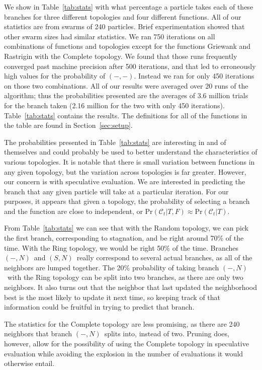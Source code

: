 \documentclass[ms,electronic,twosidetoc,letterpaper,chaptercenter,parttop,equalmargins]{byumsphd}
\renewcommand{\sec}[1]{Section~\ref{sec:#1}}
\providecommand{\caseset}{\ensuremath{\mathcal{C}}}
\providecommand{\casepn}{\ensuremath{(-,-)}}
\providecommand{\casepN}{\ensuremath{(-,N)}}
\providecommand{\casexN}{\ensuremath{(S,N)}}
\providecommand{\prob}{\ensuremath{\mathrm{Pr}}}
\begin{document}
We show in Table~\ref{tab:stats} with what percentage a particle takes each of
these branches for three different topologies and four different functions.
All of our statistics are from swarms of 240 particles.  Brief experimentation
showed that other swarm sizes had similar statistics.  We ran 750 iterations on
all combinations of functions and topologies except for the functions Griewank
and Rastrigin with the Complete topology.  We found that those runs frequently
converged past machine precision after 500 iterations, and that led to
erroneously high values for the probability of \casepn.  Instead we ran for
only 450 iterations on those two combinations.  All of our results were
averaged over 20 runs of the algorithm; thus the probabilities presented are
the averages of 3.6 million trials for the branch taken (2.16 million for the
two with only 450 iterations).  Table~\ref{tab:stats} contains the results.
The definitions for all of the functions in the table are found in \sec{setup}.

The probabilities presented in Table~\ref{tab:stats} are interesting in and of
themselves and could probably be used to better understand the characteristics
of various topologies.  It is notable that there is small variation between
functions in any given topology, but the variation across topologies is far
greater.  However, our concern is with speculative evaluation.  We are
interested in predicting the branch that any given particle will take at a
particular iteration.  For our purposes, it appears that given a topology, the
probability of selecting a branch and the function are close to independent, or
$\prob(\caseset_t|T,F) \approx \prob(\caseset_t|T)$.

From Table~\ref{tab:stats} we can see that with the Random topology, we can
pick the first branch, corresponding to stagnation, and be right around 70\% of
the time.  With the Ring topology, we would be right 50\% of the time.
Branches \casepN\ and \casexN\ really correspond to several actual branches, as
all of the neighbors are lumped together.  The 20\% probability of taking
branch \casepN\ with the Ring topology can be split into two branches, as there
are only two neighbors.  It also turns out that the neighbor that last updated
the neighborhood best is the most likely to update it next time, so keeping
track of that information could be fruitful in trying to predict that branch.

The statistics for the Complete topology are less promising, as there are 240
neighbors that branch \casepN\ splits into, instead of two.  Pruning does,
however, allow for the possibility of using the Complete topology in
speculative evaluation while avoiding the explosion in the number of
evaluations it would otherwise entail.
\end{document}
